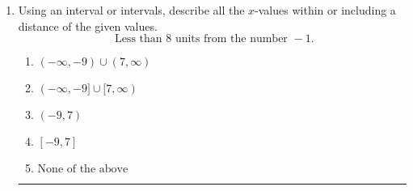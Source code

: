 \documentclass[14pt]{extbook}
\newcommand{\litem}[1]{\item#1\hspace*{-1cm}\rule{\textwidth}{0.4pt}}
\begin{document}
\begin{enumerate}
{\begin{enumerate}[label=\Alph*.]
\end{enumerate} }
\litem{
Using an interval or intervals, describe all the $x$-values within or including a distance of the given values.\[ \text{ Less than } 8 \text{ units from the number } -1. \]\begin{enumerate}[label=\Alph*.]
\item \( (-\infty, -9) \cup (7, \infty) \)
\item \( (-\infty, -9] \cup [7, \infty) \)
\item \( (-9, 7) \)
\item \( [-9, 7] \)
\item \( \text{None of the above} \)

\end{enumerate} }
\end{enumerate}
\end{document}
